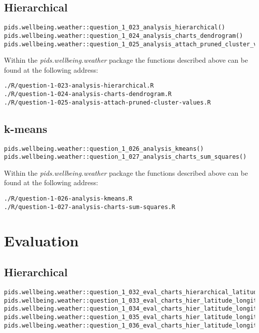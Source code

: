 \documentclass[12pt, oneside, openany]{book}
\begin{document}
\subsection*{Hierarchical}

\begin{verbatim}
pids.wellbeing.weather::question_1_023_analysis_hierarchical()
pids.wellbeing.weather::question_1_024_analysis_charts_dendrogram()
pids.wellbeing.weather::question_1_025_analysis_attach_pruned_cluster_values()
\end{verbatim}

Within the \emph{pids.wellbeing.weather} package the functions described above can be found at the following address:

\begin{verbatim}
./R/question-1-023-analysis-hierarchical.R
./R/question-1-024-analysis-charts-dendrogram.R
./R/question-1-025-analysis-attach-pruned-cluster-values.R
\end{verbatim}

\subsection*{k-means}

\begin{verbatim}
pids.wellbeing.weather::question_1_026_analysis_kmeans()
pids.wellbeing.weather::question_1_027_analysis_charts_sum_squares()
\end{verbatim}

Within the \emph{pids.wellbeing.weather} package the functions described above can be found at the following address:

\begin{verbatim}
./R/question-1-026-analysis-kmeans.R
./R/question-1-027-analysis-charts-sum-squares.R
\end{verbatim}

\section*{Evaluation}

\subsection*{Hierarchical}

\begin{verbatim}
pids.wellbeing.weather::question_1_032_eval_charts_hierarchical_latitude()
pids.wellbeing.weather::question_1_033_eval_charts_hier_latitude_longitude_hours_sun()
pids.wellbeing.weather::question_1_034_eval_charts_hier_latitude_longitude_rain_mm()
pids.wellbeing.weather::question_1_035_eval_charts_hier_latitude_longitude_max_temp()
pids.wellbeing.weather::question_1_036_eval_charts_hier_latitude_longitude_min_temp()
\end{verbatim}
\end{document}
